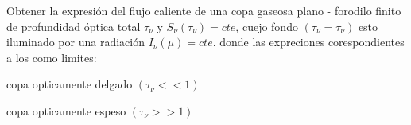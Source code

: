 \documentclass[12pt,spanish,a4paper]{practice}
\begin{document}
    \begin{problem}\label{prob:6}
        Obtener la expresión del flujo caliente de una copa gaseosa plano - forodilo finito de profundidad óptica total $\tau_{\nu}$ y $S_{\nu}(\tau_{\nu}) = cte$, cuejo fondo $(\tau_{\nu}=\tau_{\nu})$ esto iluminado por una radiación $I_{\nu}(\mu) = cte$. donde las expreciones corespondientes a los como limites:

        \begin{ppart}\label{prob:6:a}
            copa opticamente delgado $(\tau_{\nu}<< 1)$
        \end{ppart}

        \begin{ppart}\label{prob:6:b}
            copa opticamente espeso $(\tau_{\nu}>>1)$    
        \end{ppart}
        
        
    \end{problem}
    
\end{document}
